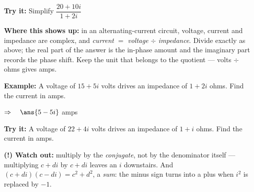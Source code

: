 \documentclass[12pt]{article}
\begin{document}
\begin{tryitbox}
\textbf{Try it:} \quad Simplify $\dfrac{20 + 10i}{1 + 2i}$\\[2pt]
\end{tryitbox}


\begin{formulabox}
\textbf{Where this shows up:} in an alternating-current circuit, voltage,
current and impedance are complex, and \textit{current} $=$ \textit{voltage}
$\div$ \textit{impedance}. Divide exactly as above; the real part of the answer
is the in-phase amount and the imaginary part records the phase shift. Keep the
unit that belongs to the quotient --- volts $\div$ ohms gives amps.
\end{formulabox}

\begin{examplebox}
\textbf{Example:} \quad A voltage of $15 + 5i$ volts drives an impedance of
$1 + 2i$ ohms. Find the current in amps.

$\Rightarrow\quad \ans{5 - 5i}$ amps
\end{examplebox}

\begin{tryitbox}
\textbf{Try it:} \quad A voltage of $22 + 4i$ volts drives an impedance of
$1 + i$ ohms. Find the current in amps.\\[2pt]
\end{tryitbox}

\begin{watchoutbox}
\textbf{(!) Watch out:} multiply by the \textit{conjugate}, not by the
denominator itself --- multiplying $c + di$ by $c + di$ leaves an $i$ downstairs.
And $(c + di)(c - di) = c^2 + d^2$, a \textit{sum}: the minus sign turns into a
plus when $i^2$ is replaced by $-1$.
\end{watchoutbox}
\end{document}
